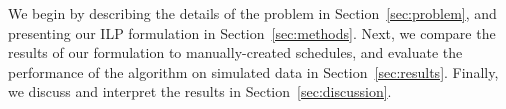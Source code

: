 We begin by describing the details of the problem in Section~\ref{sec:problem}, and presenting
our ILP formulation in Section~\ref{sec:methods}. Next, we compare the results
of our formulation to manually-created schedules, and evaluate the performance
of the algorithm on simulated data in Section~\ref{sec:results}. Finally, we
discuss and interpret the results in Section~\ref{sec:discussion}. %
